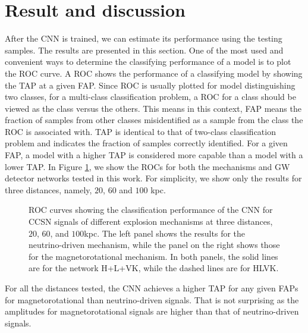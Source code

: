 \documentclass[aps,twocolumn,showpacs,groupedaddress, nofootinbib]{revtex4}  %
\begin{document}
\section{Result and discussion}\label{sec:result}
After the \ac{CNN} is trained, we can estimate its performance using the testing samples.
The results are presented in this section.
One of the most used and convenient ways to determine the classifying performance of a model is to plot the \ac{ROC} curve.
A \ac{ROC} shows the performance of a classifying model by showing the \ac{TAP} at a given \ac{FAP}. 
Since \ac{ROC} is usually plotted for model distinguishing two classes, 
for a multi-class classification problem, 
a \ac{ROC} for a class should be viewed as the class versus the others.
This means in this context, \ac{FAP} means the fraction of samples from other 
classes misidentified as a sample from the class the \ac{ROC} is associated with.
\ac{TAP} is identical to that of two-class classification problem and indicates the fraction of samples correctly identified.
For a given \ac{FAP}, a model with a higher \ac{TAP} is considered more capable than a model with a lower \ac{TAP}.
In Figure \ref{fig:ROClog}, we show the \acp{ROC} for both the mechanisms and \ac{GW} detector networks tested in this work. 
For simplicity, we show only the results for three distances, namely, $20$, $60$ and $100$ kpc.
\begin{figure}
     \begin{center}
%
        \quad
%
    \end{center}
    \caption{ROC curves showing the classification performance of the \ac{CNN} for \ac{CCSN} signals of different explosion mechanisms at three distances, $20$, $60$, and $100$kpc.
The left panel shows the results for the neutrino-driven mechanism, while the panel on the right shows those for the magnetorotational mechanism.
In both panels, the solid lines are for the network H+L+VK, while the dashed lines are for HLVK.
\label{fig:ROClog}}%
\end{figure}
For all the distances tested, the \ac{CNN} achieves a higher \ac{TAP} for any given \acp{FAP} 
for magnetorotational than neutrino-driven signals.
That is not surprising as the amplitudes for magnetorotational signals are higher than that of neutrino-driven signals.
\end{document}
